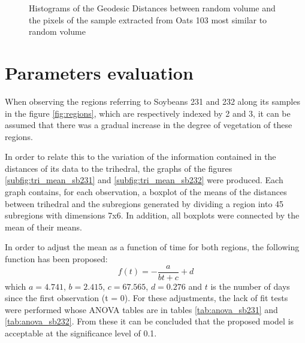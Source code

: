 \documentclass[12pt]{article}
\begin{document}
\begin{figure}[hbt]
\centering
{}
\caption{Histograms of the Geodesic Distances between random volume and the pixels of the sample extracted from Oats 103 most similar to random volume}
\label{fig:ot103_hist_rv}
\end{figure}

\section{Parameters evaluation}
When observing the regions referring to Soybeans 231 and 232 along its samples in the figure \ref{fig:regions}, which are respectively indexed by 2 and 3, it can be assumed that there was a gradual increase in the degree of vegetation of these regions.

In order to relate this to the variation of the information contained in the distances of its data to the trihedral, the graphs of the figures \ref{subfig:tri_mean_sb231} and \ref{subfig:tri_mean_sb232} were produced. Each graph contains, for each observation, a boxplot of the means of the distances between trihedral and the subregions generated by dividing a region into 45 subregions with dimensions 7x6. In addition, all boxplots were connected by the mean of their means.

In order to adjust the mean as a function of time for both regions, the following function has been proposed:
\begin{equation}
f(t) = -\frac{a}{bt + c} + d
\end{equation}
which $a = 4.741$, $b = 2.415$, $c = 67.565$, $d = 0.276$ and $t$ is the number of days since the first observation (t = 0). For these adjustments, the lack of fit tests were performed whose ANOVA tables are in tables \ref{tab:anova_sb231} and \ref{tab:anova_sb232}. From these it can be concluded that the proposed model is acceptable at the significance level of 0.1.
\end{document}
